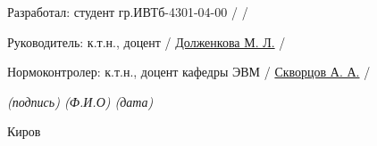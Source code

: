 \begin{titlepage}
	\newcommand{\ulinesize}{2.5cm}

	\large
	\vspace{1cm}
	\noindent
	Разработал: студент гр.ИВТб-4301-04-00 \hfill \uline{\hspace{\ulinesize}}
	/ \uline{\authori} / \hspace{8mm} \uline{\hspace{\ulinesize}}

	\vspace{1.5cm}
	\noindent
	Руководитель: к.т.н., доцент
	\hfill \uline{\hspace{\ulinesize}}
	/ \uline{Долженкова М. Л.} / \uline{\hspace{\ulinesize}}

	\vspace{1.5cm}
	\noindent
	Нормоконтролер: к.т.н., доцент кафедры ЭВМ
	\hfill \uline{\hspace{\ulinesize}}
	/ \uline{Скворцов А. А.} / \hspace{4mm} \uline{\hspace{\ulinesize}}

	{
		\small
		\itshape
		\hfill
		(подпись) \hspace{1.6cm} (Ф.И.О) \hspace{2.2cm} (дата) \hspace{0.8cm}
	}

	\begin{center}
		\vfill
		Киров \the\year
		\vspace{1cm}
	\end{center}


\end{titlepage}
